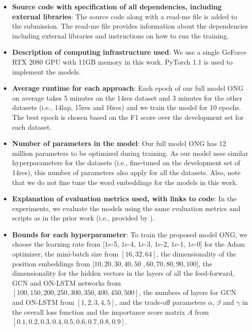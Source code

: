 \documentclass[11pt,a4paper]{article}
\begin{document}
\begin{itemize}






\item \textbf{Source code with specification of all dependencies, including external libraries}: The source code along with a read-me file is added to the submission. The read-me file provides information about the dependencies including external libraries and instructions on how to run the training. 



\item \textbf{Description of computing infrastructure
used}: We use a single GeForce RTX 2080 GPU with 11GB memory in this work. PyTorch 1.1 is used to implement the models.


\item \textbf{Average runtime for each approach}: Each epoch of our full model ONG on average takes 5 minutes on the 14res dataset and 3 minutes for the other datasets (i.e., 14lap, 15res and 16res) and we train the model for 10 epochs. The best epoch is chosen based on the F1 score over the development set for each dataset.


\item \textbf{Number of parameters in the model}: Our full model ONG has 12 million parameters to be optimized during training. As our model uses similar hyperparameters for the datasets (i.e., fine-tuned on the development set of 14res), this number of parameters also apply for all the datasets. Also, note that we do not fine tune the word embeddings for the models in this work.

\item \textbf{Explanation of evaluation metrics used,
with links to code}: In the experiments, we evaluate the models using the same evaluation metrics and scripts as in the prior work (i.e., provided by \citep{fan2019target}).







\item \textbf{Bounds for each hyperparameter}: To train the proposed model ONG, we choose the learning rate from [$1e$-5, $1e$-4, $1e$-3, $1e$-2, $1e$-1, $1e$-0] for the Adam optimizer, the mini-batch size from $[16, 32, 64]$, the dimensionality of the position embeddings from $[10,20,30,40,50$ $,60,70,80,90,100]$, the dimensionality for the hidden vectors in the layers of all the feed-forward, GCN and ON-LSTM networks from $[100, 150, 200, 250, 300, 350, 400, 450, 500]$, the numbers of layers for GCN and ON-LSTM from $[1,2,3,4,5]$, and the trade-off parameters $\alpha$, $\beta$ and $\gamma$ in the overall loss function and the importance score matrix $A$ from $[0.1, 0.2, 0.3, 0.4, 0.5, 0.6, 0.7, 0.8, 0.9]$.




\end{itemize}
\end{document}
